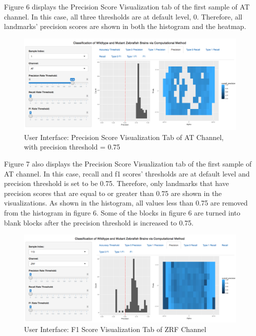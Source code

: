 \documentclass[10pt,letterpaper]{article}
\begin{document}
Figure 6 displays the Precision Score Visualization tab of the first
sample of AT channel. In this case, all three thresholds are at default
level, 0. Therefore, all landmarks' precision scores are shown in both
the histogram and the heatmap.

\begin{figure}[h]

{\centering \includegraphics[width=4.9in]{figures/shiny3} 

}

\caption{User Interface: Precision Score Visualization Tab of AT Channel, with precision threshold = 0.75}\label{fig:shiny3}
\end{figure}

Figure 7 also displays the Precision Score Visualization tab of the
first sample of AT channel. In this case, recall and f1 scores'
thresholds are at default level and precision threshold is set to be
0.75. Therefore, only landmarks that have precision scores that are
equal to or greater than 0.75 are shown in the visualizations. As shown
in the histogram, all values less than 0.75 are removed from the
histogram in figure 6. Some of the blocks in figure 6 are turned into
blank blocks after the precision threshold is increased to 0.75.

\begin{figure}[h]

{\centering \includegraphics[width=5.04in]{figures/shiny8} 

}

\caption{User Interface: F1 Score Visualization Tab of ZRF Channel}\label{fig:shiny8}
\end{figure}
\end{document}
